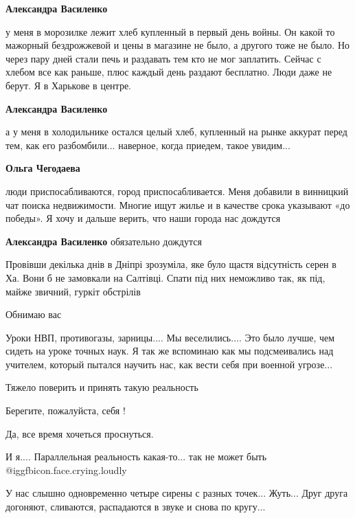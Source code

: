 \begin{itemize}
\begin{itemize} %
\textbf{Александра Василенко} 

у меня в морозилке лежит хлеб купленный в первый день войны. Он какой то
мажорный бездрожжевой и цены в магазине не было, а другого тоже не было. Но
через пару дней стали печь и раздавать тем кто не мог заплатить. Сейчас с
хлебом все как раньше, плюс каждый день раздают бесплатно. Люди даже не берут.
Я в Харькове в центре.

\textbf{Александра Василенко} 

а у меня в холодильнике остался целый хлеб, купленный на рынке аккурат перед
тем, как его разбомбили... наверное, когда приедем, такое увидим...

\textbf{Ольга Чегодаева} 

люди приспосабливаются, город приспосабливается. Меня добавили в винницкий чат
поиска недвижимости. Многие ищут жилье и в качестве срока указывают «до
победы». Я хочу и дальше верить, что наши города нас дождутся

\textbf{Александра Василенко} обязательно дождутся
\end{itemize} %


Провівши декілька днів в Дніпрі зрозуміла, яке було щастя відсутність серен в
Ха. Вони б не замовкали на Салтівці. Спати під них неможливо так, як під, майже
звичний, гуркіт обстрілів

Обнимаю вас


Уроки НВП, противогазы, зарницы.... Мы веселились.... Это было лучше, чем
сидеть на уроке точных наук. Я так же вспоминаю как мы подсмеивались над
учителем, который пытался научить нас, как вести себя при военной угрозе...

Тяжело поверить и принять такую реальность

Берегите, пожалуйста, себя !

Да, все время хочеться проснуться.

И я.... Параллельная реальность какая-то... так не может быть  @igg{fbicon.face.crying.loudly} 


У нас слышно одновременно четыре сирены с разных точек... Жуть... Друг друга
догоняют, сливаются, распадаются в звуке и снова по кругу...


\end{itemize}
